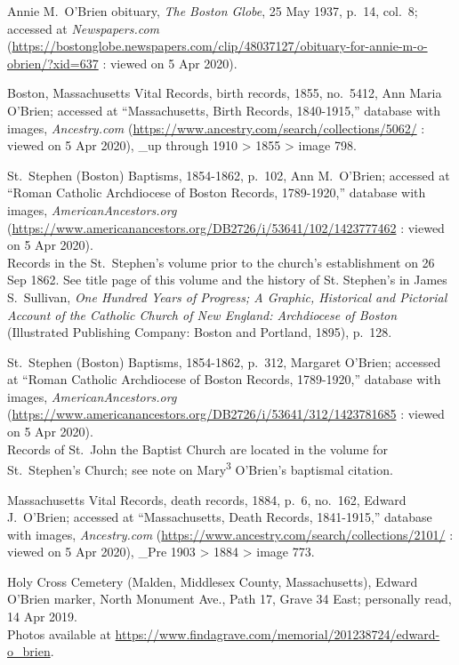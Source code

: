 \begin{thebibliography}{999}
	Annie M.\ O'Brien obituary, \textit{The Boston Globe}, 25 May 1937, p.\ 14, col.\ 8; accessed at \textit{Newspapers.com} (\url{https://bostonglobe.newspapers.com/clip/48037127/obituary-for-annie-m-o-obrien/?xid=637} : viewed on 5 Apr 2020).
	
	Boston, Massachusetts Vital Records, birth records, 1855, no.\ 5412, Ann Maria O'Brien; accessed at ``Massachusetts, Birth Records, 1840-1915,'' database with images, \textit{Ancestry.com} (\url{https://www.ancestry.com/search/collections/5062/} : viewed on 5 Apr 2020), \_up through 1910 > 1855 > image 798.
	
	St.\ Stephen (Boston) Baptisms, 1854-1862, p.\ 102, Ann M.\ O'Brien; accessed at ``Roman Catholic Archdiocese of Boston Records, 1789-1920,'' database with images, \textit{AmericanAncestors.org} (\url{https://www.americanancestors.org/DB2726/i/53641/102/1423777462} : viewed on 5 Apr 2020).\\
	Records in the St.\ Stephen's volume prior to the church's establishment on 26 Sep 1862. See title page of this volume and the history of St. Stephen's in James S.\ Sullivan, \textit{One Hundred Years of Progress; A Graphic, Historical and Pictorial Account of the Catholic Church of New England: Archdiocese of Boston} (Illustrated Publishing Company: Boston and Portland, 1895), p.\ 128.
	
	St.\ Stephen (Boston) Baptisms, 1854-1862, p.\ 312, Margaret O'Brien; accessed at ``Roman Catholic Archdiocese of Boston Records, 1789-1920,'' database with images, \textit{AmericanAncestors.org} (\url{https://www.americanancestors.org/DB2726/i/53641/312/1423781685} : viewed on 5 Apr 2020).\\
	Records of St.\ John the Baptist Church are located in the volume for St.\ Stephen's Church; see note on Mary\textsuperscript{3} O'Brien's baptismal citation.
	
	Massachusetts Vital Records, death records, 1884, p.\ 6, no.\ 162, Edward J.\ O'Brien; accessed at ``Massachusetts, Death Records, 1841-1915,'' database with images, \textit{Ancestry.com} (\url{https://www.ancestry.com/search/collections/2101/} : viewed on 5 Apr 2020), \_Pre 1903 > 1884 > image 773.	
	
	Holy Cross Cemetery (Malden, Middlesex County, Massachusetts), Edward O'Brien marker, North Monument Ave., Path 17, Grave 34 East; personally read, 14 Apr 2019. \\
	Photos available at \url{https://www.findagrave.com/memorial/201238724/edward-o_brien}.


\end{thebibliography}
